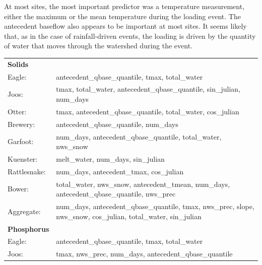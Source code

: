 \documentclass[10pt]{article}
\begin{document}
At most sites, the most important predictor was a temperature measurement, either the maximum or the mean temperature during the loading event. The antecedent baseflow also appears to be important at most sites. It seems likely that, as in the case of rainfall-driven events, the loading is driven by the quantity of water that moves through the watershed during the event.\\

\begin{table}[h!]\small
    \begin{center}
    \begin{tabular}{ll}
        \textbf{Solids} & \\
        \hspace{5mm} Eagle: & antecedent\_qbase\_quantile, tmax, total\_water\\
        \hspace{5mm} Joos: & tmax, total\_water, antecedent\_qbase\_quantile, sin\_julian, num\_days\\
        \hspace{5mm} Otter: & tmax, antecedent\_qbase\_quantile, total\_water, cos\_julian\\
        \hspace{5mm} Brewery: & antecedent\_qbase\_quantile, num\_days\\
        \hspace{5mm} Garfoot: & num\_days, antecedent\_qbase\_quantile, total\_water, nws\_snow\\
        \hspace{5mm} Kuenster: & melt\_water, num\_days, sin\_julian\\
        \hspace{5mm} Rattlesnake: & num\_days, antecedent\_tmax, cos\_julian \\
        \hspace{5mm} Bower: & total\_water, nws\_snow, antecedent\_tmean, num\_days, antecedent\_qbase\_quantile, nws\_prec\\
        \hspace{5mm} Aggregate: & num\_days, antecedent\_qbase\_quantile, tmax, nws\_prec, slope, nws\_snow, cos\_julian, total\_water, sin\_julian
    \vspace{2mm}\\
        \textbf{Phosphorus} & \\
        \hspace{5mm} Eagle: & antecedent\_qbase\_quantile, tmax, total\_water\\
        \hspace{5mm} Joos: & tmax, nws\_prec, num\_days, antecedent\_qbase\_quantile\\

\end{tabular}
\end{center}
\end{table}
\end{document}
